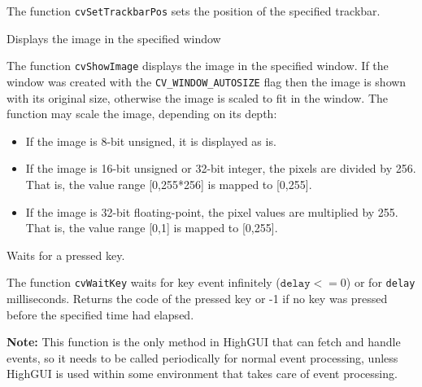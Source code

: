 \begin{description}
\end{description}

The function \texttt{cvSetTrackbarPos} sets the position of the specified trackbar.

Displays the image in the specified window


\begin{description}
\end{description}

The function \texttt{cvShowImage} displays the image in the specified window. If the window was created with the \texttt{CV\_WINDOW\_AUTOSIZE} flag then the image is shown with its original size, otherwise the image is scaled to fit in the window. The function may scale the image, depending on its depth:
\begin{itemize}
    \item If the image is 8-bit unsigned, it is displayed as is.
    \item If the image is 16-bit unsigned or 32-bit integer, the pixels are divided by 256. That is, the value range [0,255*256] is mapped to [0,255].
    \item If the image is 32-bit floating-point, the pixel values are multiplied by 255. That is, the value range [0,1] is mapped to [0,255].
\end{itemize}

Waits for a pressed key.


\begin{description}
\end{description}

The function \texttt{cvWaitKey} waits for key event infinitely ($ \texttt{delay} <= 0$) or for \texttt{delay} milliseconds. Returns the code of the pressed key or -1 if no key was pressed before the specified time had elapsed.

\textbf{Note:} This function is the only method in HighGUI that can fetch and handle events, so it needs to be called periodically for normal event processing, unless HighGUI is used within some environment that takes care of event processing.


